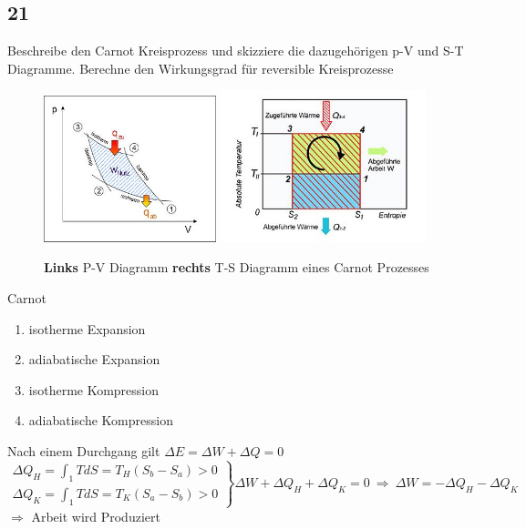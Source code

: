 \documentclass[12pt,a4paper]{report}
\newenvironment{myfrag}{\begin{it}}{\end{it}\vspace{3mm}\par}
\numberwithin{equation}{section}
\begin{document}
\subsection{21}
\begin{myfrag}
Beschreibe den Carnot Kreisprozess und skizziere die dazugehörigen p-V und S-T
Diagramme. Berechne den Wirkungsgrad für reversible Kreisprozesse
\end{myfrag}
\begin{figure}[H]
\includegraphics[width=5cm]{Bilder/Frage21pV.jpg} 
\includegraphics[width=6cm]{Bilder/Frage21TS.jpg} 
\caption{\textbf{Links} P-V Diagramm \textbf{rechts} T-S Diagramm eines Carnot Prozesses}
\end{figure}
Carnot
\begin{enumerate}
\item isotherme Expansion
\item adiabatische Expansion
\item isotherme Kompression
\item adiabatische Kompression
\end{enumerate}
Nach einem Durchgang gilt $ \Delta E = \Delta W + \Delta Q = 0$
\\[2ex]
$\left. \begin{array}{c} \Delta Q_H = \int_1 TdS = T_H(S_b-S_a) > 0 \\ \Delta Q_K = \int_1 TdS = T_K(S_a-S_b) > 0
\end{array} \right\rbrace \Delta W + \Delta Q_H + \Delta Q_K = 0 \ \Rightarrow \ \Delta W = - \Delta Q_H - \Delta Q_K$ \\[1ex]
$\Rightarrow$  Arbeit wird Produziert \\[2ex]
\end{document}
